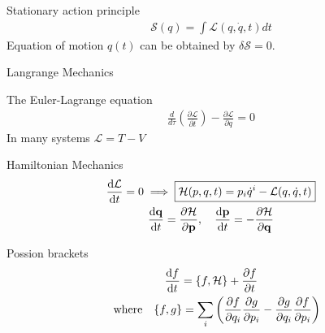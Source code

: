 \documentclass[main]{subfiles}
\begin{document}
\begin{multicols}{2}

Stationary action principle
\begin{gather}
    \mathcal{S}(q) = \int \mathcal{L}(q,\dot{q},t) dt
\end{gather}
Equation of motion $q(t)$ can be obtained by $\delta \mathcal{S} = 0$.

Langrange Mechanics

The Euler-Lagrange equation
\begin{gather}
    \boxed{
        \frac{d}{d\tau}\left(\frac{\partial \mathcal{L}}{\partial \dot t}\right) - \frac{\partial \mathcal{L}}{\partial q} = 0
    }
\end{gather}
In many systems $\mathcal{L} = T - V$

Hamiltonian Mechanics
\begin{gather}
    \dv{\mathcal{L}}{t} = 0 \implies \boxed{\mathcal{H}(p,q,t) = p_i\dot{q}^i - \mathcal{L}(q,\dot{q},t)}\\
    \dv{\vb{q}}{t} = \pdv{\mathcal{H}}{\vb{p}}, \quad \dv{\vb{p}}{t} = -\pdv{\mathcal{H}}{\vb{q}}
\end{gather}

Possion brackets
\begin{gather}
    \dv{f}{t} = \poissonbracket{f}{\mathcal{H}} + \pdv{f}{t}\\
    \qq{where}\poissonbracket{f}{g} = \sum_i\qty(\pdv{f}{q_i}\pdv{g}{p_i} - \pdv{g}{q_i}\pdv{f}{p_i})
\end{gather}


\end{multicols}
\end{document}
